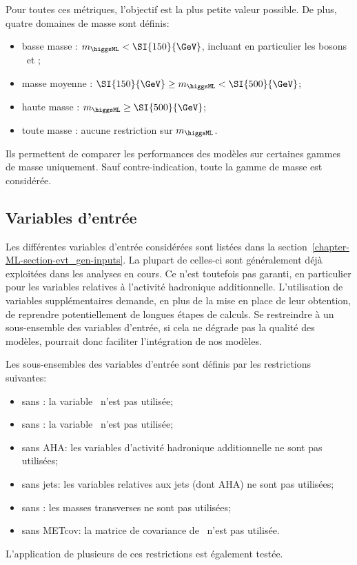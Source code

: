 Pour toutes ces métriques, l'objectif est la plus petite valeur possible.
De plus, quatre domaines de masse sont définis:
\begin{itemize}
\item basse masse : $m_{\higgsML} < \SI{150}{\GeV}$, incluant en particulier les bosons \Zboson\ et \higgs;
\item masse moyenne : $\SI{150}{\GeV} \geq m_{\higgsML} < \SI{500}{\GeV}$;
\item haute masse : $m_{\higgsML} \geq \SI{500}{\GeV}$;
\item toute masse : aucune restriction sur $m_{\higgsML}$.
\end{itemize}
Ils permettent de comparer les performances des modèles sur certaines gammes de masse uniquement.
Sauf contre-indication, toute la gamme de masse est considérée.
\subsection{Variables d'entrée}
Les différentes variables d'entrée considérées sont listées dans la section~\ref{chapter-ML-section-evt_gen-inputs}.
La plupart de celles-ci sont généralement déjà exploitées dans les analyses en cours.
Ce n'est toutefois pas garanti, en particulier pour les variables relatives à l'activité hadronique additionnelle.
L'utilisation de variables supplémentaires demande,
en plus de la mise en place de leur obtention,
de reprendre potentiellement de longues étapes de calculs.
Se restreindre à un sous-ensemble des variables d'entrée,
si cela ne dégrade pas la qualité des modèles,
pourrait donc faciliter l'intégration de nos modèles.
\par
Les sous-ensembles des variables d'entrée sont définis par les restrictions suivantes:
\begin{itemize}
\item sans \Npu: la variable \Npu\ n'est pas utilisée;
\item sans \Nnu: la variable \Nnu\ n'est pas utilisée;
\item sans AHA: les variables d'activité hadronique additionnelle ne sont pas utilisées;
\item sans jets: les variables relatives aux jets (dont AHA) ne sont pas utilisées;
\item sans \mT: les masses transverses ne sont pas utilisées;
\item sans METcov: la matrice de covariance de \MET\ n'est pas utilisée.
\end{itemize}
L'application de plusieurs de ces restrictions est également testée.
